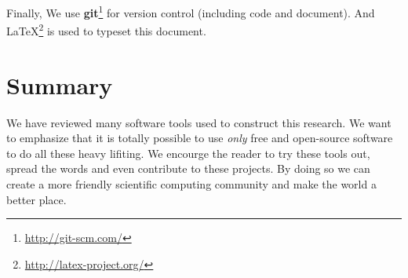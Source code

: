 Finally, We use \textbf{git}\footnote{\url{http://git-scm.com/}} for version control (including code and document). And \LaTeX\footnote{\url{http://latex-project.org/}} is used to typeset this document.

\section*{Summary}
We have reviewed many software tools used to construct this research. We want to emphasize that it is totally possible to use \textit{only} free and open-source software to do all these heavy lifiting. We encourge the reader to try these tools out, spread the words and even contribute to these projects. By doing so we can create a more friendly scientific computing community and make the world a better place.
